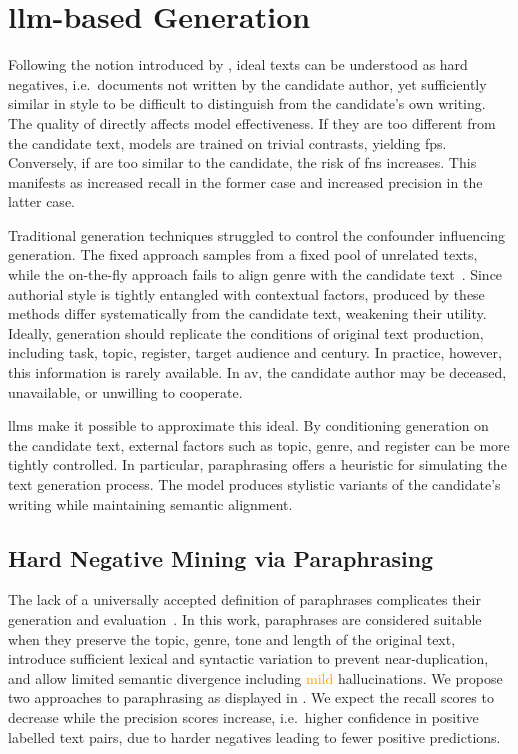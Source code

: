 \section{\acs{llm}-based \Imp{} Generation}
\label{sec:impostor_generation}

Following the notion introduced by \citet{koppel_determining_2014}, ideal \imp{} texts can be understood as hard negatives, i.e.\ documents not written by the candidate author, yet sufficiently similar in style to be difficult to distinguish from the candidate's own writing. 
The quality of \imps{} directly affects model effectiveness.
If they are too different from the candidate text, models are trained on trivial contrasts, yielding \acp{fp}. 
Conversely, if \imps{} are too similar to the candidate, the risk of \acp{fn} increases.
This manifests as increased recall in the former case and increased precision in the latter case.

Traditional \imp{} generation techniques struggled to control the confounder influencing \imp{} generation. 
The fixed approach samples from a fixed pool of unrelated texts, while the on-the-fly approach fails to align genre with the candidate text~\citep{koppel_determining_2014}. 
Since authorial style is tightly entangled with contextual factors, \imps{} produced by these methods differ systematically from the candidate text, weakening their utility. 
Ideally, \imp{} generation should replicate the conditions of original text production, including task, topic, register, target audience and century. 
In practice, however, this information is rarely available.
In \ac{av}, the candidate author may be deceased, unavailable, or unwilling to cooperate.

\acp{llm} make it possible to approximate this ideal. 
By conditioning generation on the candidate text, external factors such as topic, genre, and register can be more tightly controlled. 
In particular, paraphrasing offers a heuristic for simulating the text generation process. 
The model produces stylistic variants of the candidate's writing while maintaining semantic alignment.


\subsection{Hard Negative Mining via Paraphrasing}

The lack of a universally accepted definition of paraphrases complicates their generation and evaluation~\citep{gohsen_task_oriented_2024}. 
In this work, paraphrases are considered suitable \imps{} when they preserve the topic, genre, tone and length of the original text, introduce sufficient lexical and syntactic variation to prevent near-duplication, and allow limited semantic divergence including \textcolor{orange}{mild} hallucinations.
We propose two approaches to paraphrasing as displayed in .
We expect the \impAppr{} recall scores to decrease while the precision scores increase, i.e.\ higher confidence in positive labelled text pairs, due to harder negatives leading to fewer positive predictions.

